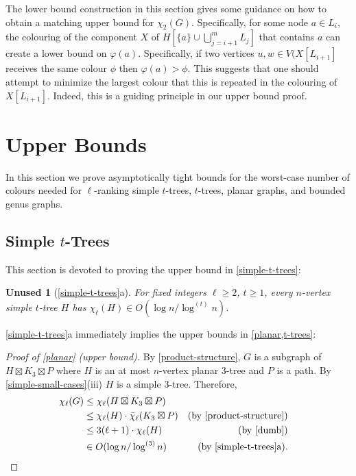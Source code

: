 \documentclass[kpfonts]{patmorin}
\newcommand{\trn}{\chi_2}
\newcommand{\lrn}{\chi_{\ell}}
\newcommand{\dlcn}{\bar{\chi}_\ell}
\theoremstyle{named}
\newtheorem*{namedtheorem}{Unused}
\newcommand{\weirdref}[2]{\cref{#1}#2}
\newcommand{\weirdlabel}[2]{\label{#1-#1}}
\begin{document}
The lower bound construction in this section gives some guidance on how to obtain a matching upper bound for $\trn(G)$.  Specifically, for some node $a\in L_i$, the colouring of the component $X$ of $H[\{a\}\cup\bigcup_{j=i+1}^m L_j]$ that contains $a$ can create a lower bound on $\varphi(a)$.  Specifically, if two vertices $u,w\in V(X[L_{i+1}]$ receives the same colour $\phi$ then $\varphi(a)>\phi$.  This suggests that one should attempt to minimize the largest colour that this is repeated in the colouring of $X[L_{i+1}]$.  Indeed, this is a guiding principle in our upper bound proof.


\section{Upper Bounds}
\label{upper-bounds}

In this section we prove asymptotically tight bounds for the worst-case number of colours needed for $\ell$-ranking simple $t$-trees, $t$-trees, planar graphs, and bounded genus graphs.

\subsection{Simple $t$-Trees}

This section is devoted to proving the upper bound in \cref{simple-t-trees}:

\begin{namedtheorem}[\weirdref{simple-t-trees}{a}]\weirdlabel{simple-t-trees}{a}
    For fixed integers $\ell\ge 2$, $t\ge 1$, every $n$-vertex simple $t$-tree $H$ has $\lrn(H)\in O(\log n/\log^{(t)} n)$.
\end{namedtheorem}

\weirdref{simple-t-trees}{a} immediately implies the upper bounds in \cref{planar,t-trees}:

\begin{proof}[Proof of \cref{planar} (upper bound)]
    By \cref{product-structure}, $G$ is a subgraph of $H\boxtimes K_3\boxtimes P$ where $H$ is an at most $n$-vertex planar 3-tree and $P$ is a path. By \cref{simple-small-cases}(iii) $H$ is a simple 3-tree. Therefore,
    \begin{align*}
        \lrn(G) & \le \lrn(H\boxtimes K_3\boxtimes P) \\
                & \le \lrn(H)\cdot \dlcn(K_3\boxtimes P)
                    & \text{(by \cref{product-structure})}\\
                & \le 3(\ell+1)\cdot\lrn(H) & \text{(by \cref{dumb})} \\
                & \in O(\log n/\log^{(3)} n) & \text{(by \weirdref{simple-t-trees}{a}).} & \qedhere
    \end{align*}
\end{proof}
\end{document}
